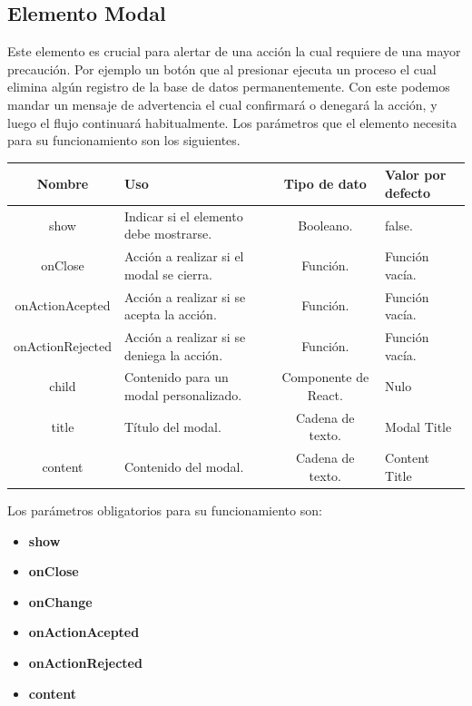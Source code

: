     \subsection{Elemento Modal}
    Este elemento es crucial para alertar de una acción la cual requiere de una mayor precaución. Por ejemplo un botón que al presionar ejecuta un proceso el cual elimina algún registro de la base de datos permanentemente.
Con este podemos mandar un mensaje de advertencia el cual confirmará o denegará  la acción, y luego el flujo continuará habitualmente.
Los parámetros que el elemento necesita para su funcionamiento son los siguientes.
\newline
    \newline
    \begin{center}
     \begin{tabular}{ | c |  p{5cm}  | c | p{3cm} |} 
     \hline
     \textbf{Nombre} &  \textbf{Uso} &  \textbf{ Tipo de dato} &  \textbf{Valor por defecto}\\ [0.5ex] 
     \hline\hline
      show &  Indicar si el elemento debe mostrarse. &  Booleano. &  false. \\  [2.5ex] 
      \hline
      onClose &   Acción a realizar si el modal se cierra. &  Función.  &  Función vacía. \\  [2.5ex] 
      \hline
      onActionAcepted &   Acción a realizar si se acepta la acción. &  Función.  &  Función vacía. \\  [2.5ex] 
      \hline
      onActionRejected &  Acción a realizar si se deniega la acción. & Función.  &  Función vacía. \\  [2.5ex] 
      \hline
      child &  Contenido para un modal personalizado.  & Componente de React.  &  Nulo \\  [2.5ex] 
      \hline
      title &   Título del modal. & Cadena de texto.   &  Modal Title  \\  [2.5ex] 
      \hline
      content&  Contenido del modal.  &  Cadena de texto.  &   Content Title\\  [2.5ex] 
     \hline
    \end{tabular}
    \end{center}
    \newline
        \newline
Los parámetros obligatorios para su funcionamiento son:
\begin{itemize}
\item \textbf{show} 
\item \textbf{onClose} 
\item \textbf{onChange} 
\item \textbf{onActionAcepted} 
\item \textbf{onActionRejected} 
\item \textbf{content} 
\end{itemize}
